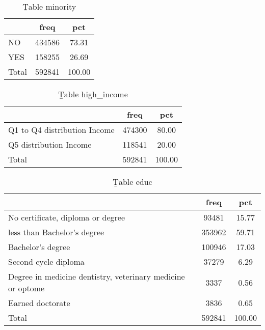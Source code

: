 \begin{table}[htbp]\centering
\def\sym#1{\ifmmode^{#1}\else\(^{#1}\)\fi}
\caption{{\b Table minority}}
\begin{tabular}{l*{1}{cc}}
\hline\hline
                              &        freq&         pct\\
\hline
NO                            &      434586&       73.31\\
YES                           &      158255&       26.69\\
Total                         &      592841&      100.00\\
\hline\hline
\end{tabular}
\end{table}
\begin{table}[htbp]\centering
\def\sym#1{\ifmmode^{#1}\else\(^{#1}\)\fi}
\caption{{\b Table high\_income}}
\begin{tabular}{l*{1}{cc}}
\hline\hline
                              &        freq&         pct\\
\hline
Q1 to Q4 distribution Income  &      474300&       80.00\\
Q5 distribution Income        &      118541&       20.00\\
Total                         &      592841&      100.00\\
\hline\hline
\end{tabular}
\end{table}
\begin{table}[htbp]\centering
\def\sym#1{\ifmmode^{#1}\else\(^{#1}\)\fi}
\caption{{\b Table educ}}
\begin{tabular}{l*{1}{cc}}
\hline\hline
                              &        freq&         pct\\
\hline
No certificate, diploma or degree&       93481&       15.77\\
less than Bachelor's degree   &      353962&       59.71\\
Bachelor's degree             &      100946&       17.03\\
Second cycle diploma          &       37279&        6.29\\
Degree in medicine dentistry, veterinary medicine or optome&        3337&        0.56\\
Earned doctorate              &        3836&        0.65\\
Total                         &      592841&      100.00\\
\hline\hline
\end{tabular}
\end{table}
